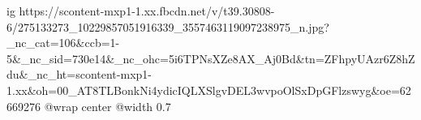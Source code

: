  
 
 
 
 

\ifcmt
  ig https://scontent-mxp1-1.xx.fbcdn.net/v/t39.30808-6/275133273_10229857051916339_3557463119097238975_n.jpg?_nc_cat=106&ccb=1-5&_nc_sid=730e14&_nc_ohc=5i6TPNsXZe8AX_Aj0Bd&tn=ZFhpyUAzr6Z8hZdu&_nc_ht=scontent-mxp1-1.xx&oh=00_AT8TLBonkNi4ydicIQLXSlgvDEL3wvpoOlSxDpGFlzswyg&oe=62669276
  @wrap center
  @width 0.7
\fi

